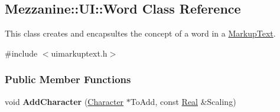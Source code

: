 \hypertarget{classMezzanine_1_1UI_1_1Word}{
\subsection{Mezzanine::UI::Word Class Reference}
\label{classMezzanine_1_1UI_1_1Word}
}


This class creates and encapsultes the concept of a word in a \hyperlink{classMezzanine_1_1UI_1_1MarkupText}{MarkupText}.  




{\ttfamily \#include $<$uimarkuptext.h$>$}

\subsubsection*{Public Member Functions}
\begin{DoxyCompactItemize}
\item 
\hypertarget{classMezzanine_1_1UI_1_1Word_a955bc923863b5a320610fd1c2cc10ecc}{
void {\bfseries AddCharacter} (\hyperlink{structMezzanine_1_1UI_1_1Character}{Character} $\ast$ToAdd, const \hyperlink{namespaceMezzanine_a726731b1a7df72bf3583e4a97282c6f6}{Real} \&Scaling)}
\label{classMezzanine_1_1UI_1_1Word_a955bc923863b5a320610fd1c2cc10ecc}

\end{DoxyCompactItemize}
